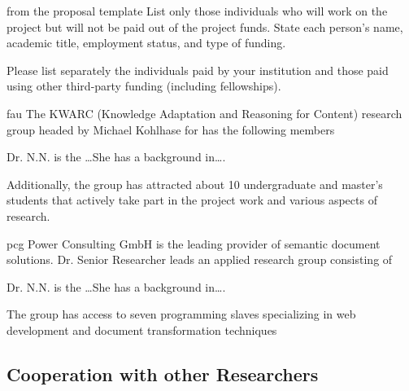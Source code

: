\begin{todo}{from the proposal template}
  List only those individuals who will work on the project but will not be paid out of the
  project funds. State each person’s name, academic title, employment status, and type of
  funding.

  Please list separately the individuals paid by your institution and those paid using
  other third-party funding (including fellowships).
\end{todo}

\begin{sitedescription}{fau}
  The KWARC (Knowledge Adaptation and Reasoning for Content) research group headed by
  Michael Kohlhase for has the following members
  \begin{compactdesc}
  \item[Dr. N.N.] is the \ldots She has a background in\ldots.
  \end{compactdesc}
  Additionally, the group has attracted about 10 undergraduate and master's students that
  actively take part in the project work and various aspects of research.
\end{sitedescription}

\begin{sitedescription}{pcg}
  Power Consulting GmbH is the leading provider of semantic document solutions. Dr. Senior
  Researcher leads an applied research group consisting of
  \begin{compactdesc}
  \item[Dr. N.N.] is the \ldots She has a background in\ldots.
  \end{compactdesc}
  The group has access to seven programming slaves specializing in web development and
  document transformation techniques
\end{sitedescription}


\subsection{Cooperation with other Researchers}\label{sec:coop}


